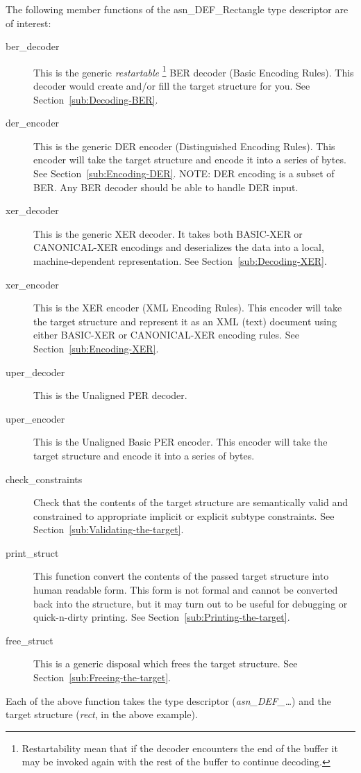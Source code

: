 \documentclass[english,oneside,12pt]{book}
\begin{document}
The following member functions of the asn\_DEF\_Rectangle type descriptor
are of interest:
\begin{description}
\item [{ber\_decoder}] This is the generic \emph{restartable}%
\footnote{Restartability mean that if the decoder encounters the end of the buffer it may be invoked again with the rest of the
buffer to continue decoding.}
BER decoder (Basic Encoding Rules). This decoder would create and/or
fill the target structure for you. See Section~\ref{sub:Decoding-BER}.
\item [{der\_encoder}] This is the generic DER encoder (Distinguished Encoding
Rules). This encoder will take the target structure and encode it
into a series of bytes. See Section~\ref{sub:Encoding-DER}. NOTE:
DER encoding is a subset of BER. Any BER decoder should be able to
handle DER input.
\item [{xer\_decoder}] This is the generic XER decoder. It takes both BASIC-XER
or CANONICAL-XER encodings and deserializes the data into a local,
machine-dependent representation. See Section~\ref{sub:Decoding-XER}.
\item [{xer\_encoder}] This is the XER encoder (XML Encoding Rules). This
encoder will take the target structure and represent it as an XML
(text) document using either BASIC-XER or CANONICAL-XER encoding rules.
See Section~\ref{sub:Encoding-XER}.
\item [{uper\_decoder}] This is the Unaligned PER decoder.
\item [{uper\_encoder}] This is the Unaligned Basic PER encoder. This encoder
will take the target structure and encode it into a series of bytes.
\item [{check\_constraints}] Check that the contents of the target structure
are semantically valid and constrained to appropriate implicit or
explicit subtype constraints. See Section~\ref{sub:Validating-the-target}.
\item [{print\_struct}] This function convert the contents of the passed
target structure into human readable form. This form is not formal
and cannot be converted back into the structure, but it may turn out
to be useful for debugging or quick-n-dirty printing. See Section~\ref{sub:Printing-the-target}.
\item [{free\_struct}] This is a generic disposal which frees the target
structure. See Section~\ref{sub:Freeing-the-target}.
\end{description}
Each of the above function takes the type descriptor (\emph{asn\_DEF\_\ldots{}})
and the target structure (\emph{rect}, in the above example).
\end{document}
